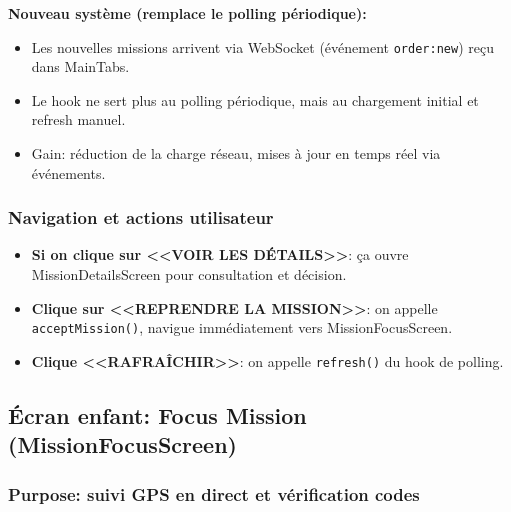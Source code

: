 \textbf{Nouveau système (remplace le polling périodique):}
\begin{itemize}
    \item Les nouvelles missions arrivent via WebSocket (événement \texttt{order:new}) reçu dans MainTabs.
    \item Le hook ne sert plus au polling périodique, mais au chargement initial et refresh manuel.
    \item Gain: réduction de la charge réseau, mises à jour en temps réel via événements.
\end{itemize}

\subsubsection{Navigation et actions utilisateur}

\begin{itemize}
    \item \textbf{Si on clique sur <<VOIR LES DÉTAILS>>}: ça ouvre MissionDetailsScreen pour consultation et décision.
    \item \textbf{Clique sur <<REPRENDRE LA MISSION>>}: on appelle \texttt{acceptMission()}, navigue immédiatement vers MissionFocusScreen.
    \item \textbf{Clique <<RAFRAÎCHIR>>}: on appelle \texttt{refresh()} du hook de polling.
\end{itemize}

\subsection{Écran enfant: Focus Mission (MissionFocusScreen)}

\subsubsection{Purpose: suivi GPS en direct et vérification codes}

